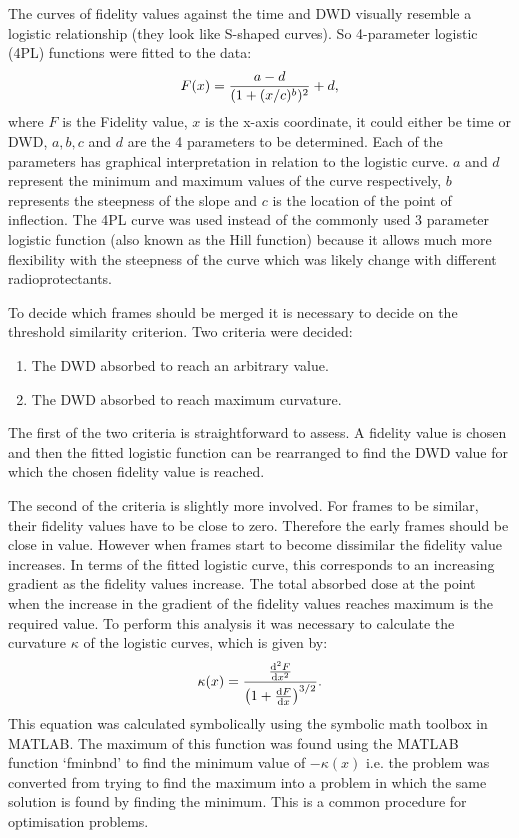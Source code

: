 The curves of fidelity values against the time and DWD visually resemble a logistic relationship (they look like S-shaped curves).
So 4-parameter logistic (4PL) functions were fitted to the data:
\begin{equation}
    F(x) = \frac{a - d}{(1 + (x/c)^b)^2} + d,
    \label{eq:4PL}
\end{equation}
where $F$ is the Fidelity value, $x$ is the x-axis coordinate, it could either be time or DWD, $a, b, c$ and $d$ are the 4 parameters to be determined.
Each of the parameters has graphical interpretation in relation to the logistic curve.
$a$ and $d$ represent the minimum and maximum values of the curve respectively, $b$ represents the steepness of the slope and $c$ is the location of the point of inflection.
The 4PL curve was used instead of the commonly used 3 parameter logistic function (also known as the Hill function) because it allows much more flexibility with the steepness of the curve which was likely change with different radioprotectants.

To decide which frames should be merged it is necessary to decide on the threshold similarity criterion.
Two criteria were decided:
\begin{enumerate}
    \item The DWD absorbed to reach an arbitrary value.
    \item The DWD absorbed to reach maximum curvature.
\end{enumerate}
The first of the two criteria is straightforward to assess.
A fidelity value is chosen and then the fitted logistic function can be rearranged to find the DWD value for which the chosen fidelity value is reached.

The second of the criteria is slightly more involved. For frames to be similar, their fidelity values have to be close to zero.
Therefore the early frames should be close in value.
However when frames start to become dissimilar the fidelity value increases.
In terms of the fitted logistic curve, this corresponds to an increasing gradient as the fidelity values increase.
The total absorbed dose at the point when the increase in the gradient of the fidelity values reaches maximum is the required value.
To perform this analysis it was necessary to calculate the curvature $\kappa$ of the logistic curves, which is  given by:
\begin{equation}
    \kappa(x) = \frac{\frac{\mathrm{d}^2F}{\mathrm{d}x^2}}{\left( 1 + \frac{\mathrm{d}F}{\mathrm{d}x}\right)^{3/2}}.
    \label{eq:Curvature}
\end{equation}
This equation was calculated symbolically using the symbolic math toolbox in MATLAB. The maximum of this function was found using the MATLAB function `fminbnd' to find the minimum value of $-\kappa(x)$ i.e. the problem was converted from trying to find the maximum into a problem in which the same solution is found by finding the minimum. This is a common procedure for optimisation problems.

